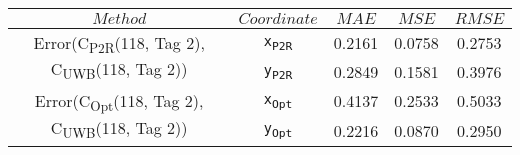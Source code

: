 \begin{table}[h]
\centering
\begin{tabular}{|c|c|c|c|c|}
\hline
$Method$ & $Coordinate$ & $MAE$ & $MSE$ & $RMSE$ \\
\hline
\multirow{2}{*}{{\footnotesize Error(C\textsubscript{P2R}(118, Tag 2), C\textsubscript{UWB}(118, Tag 2))}} & \texttt{x\textsubscript{P2R}} & 0.2161 & 0.0758 & 0.2753 \\
& \texttt{y\textsubscript{P2R}} & 0.2849 & 0.1581 & 0.3976 \\
\hline
\multirow{2}{*}{{\footnotesize Error(C\textsubscript{Opt}(118, Tag 2), C\textsubscript{UWB}(118, Tag 2))}} & \texttt{x\textsubscript{Opt}} & 0.4137 & 0.2533 & 0.5033 \\
& \texttt{y\textsubscript{Opt}} & 0.2216 & 0.0870 & 0.2950 \\
\hline
\end{tabular}
\end{table}
